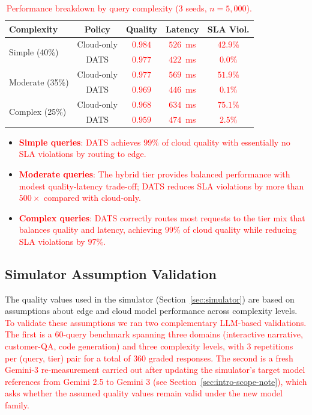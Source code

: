 \documentclass[final,3p,twocolumn,authoryear]{elsarticle}
\newcommand{\rev}[1]{\textcolor{red}{#1}}
\theoremstyle{plain}
\theoremstyle{definition}
\begin{document}
\begin{table}[t]
  \centering
  \caption{\rev{Performance breakdown by query complexity ($3$ seeds, $n{=}5{,}000$).}}
  \label{tab:complexity-breakdown}
  \small
  \begin{tabular}{lcccc}
    \toprule
    \textbf{Complexity} & \textbf{Policy} & \textbf{Quality} & \textbf{Latency} & \textbf{SLA Viol.} \\
    \midrule
    \multirow{2}{*}{Simple (40\%)} & Cloud-only & \rev{$0.984$} & \rev{$526$~ms} & \rev{$42.9\%$} \\
                                    & DATS       & \rev{$0.977$} & \rev{$422$~ms} & \rev{$0.0\%$}  \\
    \midrule
    \multirow{2}{*}{Moderate (35\%)} & Cloud-only & \rev{$0.977$} & \rev{$569$~ms} & \rev{$51.9\%$} \\
                                      & DATS       & \rev{$0.969$} & \rev{$446$~ms} & \rev{$0.1\%$}  \\
    \midrule
    \multirow{2}{*}{Complex (25\%)} & Cloud-only & \rev{$0.968$} & \rev{$634$~ms} & \rev{$75.1\%$} \\
                                     & DATS       & \rev{$0.959$} & \rev{$474$~ms} & \rev{$2.5\%$}  \\
    \bottomrule
  \end{tabular}
\end{table}

\begin{itemize}
  \item \rev{\textbf{Simple queries}: DATS achieves $99\%$ of cloud quality with essentially no SLA violations by routing to edge.}
  \item \rev{\textbf{Moderate queries}: The hybrid tier provides balanced performance with modest quality-latency trade-off; DATS reduces SLA violations by more than $500\times$ compared with cloud-only.}
  \item \rev{\textbf{Complex queries}: DATS correctly routes most requests to the tier mix that balances quality and latency, achieving $99\%$ of cloud quality while reducing SLA violations by $97\%$.}
\end{itemize}

\subsection{Simulator Assumption Validation}
\label{sec:experiments:qvalid}

The quality values used in the simulator (Section~\ref{sec:simulator}) are based on assumptions about edge and cloud model performance across complexity levels.
\rev{To validate these assumptions we ran two complementary LLM-based validations. The first is a $60$-query benchmark spanning three domains (interactive narrative, customer-QA, code generation) and three complexity levels, with $3$ repetitions per (query, tier) pair for a total of $360$ graded responses. The second is a fresh Gemini-3 re-measurement carried out after updating the simulator's target model references from Gemini 2.5 to Gemini 3 (see Section~\ref{sec:intro-scope-note}), which asks whether the assumed quality values remain valid under the new model family.}
\end{document}
